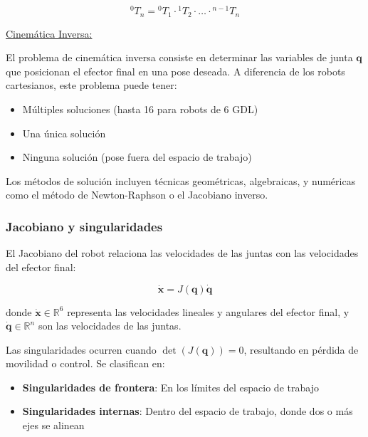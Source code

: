 \begin{equation}
{}^0T_n = {}^0T_1 \cdot {}^1T_2 \cdot \ldots \cdot {}^{n-1}T_n
\end{equation}

\underline{Cinemática Inversa:}

El problema de cinemática inversa consiste en determinar las variables de junta $\mathbf{q}$ que posicionan el efector final en una pose deseada. A diferencia de los robots cartesianos, este problema puede tener:

\begin{itemize}[label=$\bullet$]
    \item Múltiples soluciones (hasta 16 para robots de 6 GDL)
    \item Una única solución
    \item Ninguna solución (pose fuera del espacio de trabajo)
\end{itemize}

Los métodos de solución incluyen técnicas geométricas, algebraicas, y numéricas como el método de Newton-Raphson o el Jacobiano inverso.

\subsubsection{Jacobiano y singularidades}

El Jacobiano del robot relaciona las velocidades de las juntas con las velocidades del efector final:

\begin{equation}
\dot{\mathbf{x}} = J(\mathbf{q}) \dot{\mathbf{q}}
\end{equation}

donde $\dot{\mathbf{x}} \in \mathbb{R}^6$ representa las velocidades lineales y angulares del efector final, y $\dot{\mathbf{q}} \in \mathbb{R}^n$ son las velocidades de las juntas.

Las singularidades ocurren cuando $\det(J(\mathbf{q})) = 0$, resultando en pérdida de movilidad o control. Se clasifican en:

\begin{itemize}[label=$\bullet$]
    \item \textbf{Singularidades de frontera}: En los límites del espacio de trabajo
    \item \textbf{Singularidades internas}: Dentro del espacio de trabajo, donde dos o más ejes se alinean
\end{itemize}


